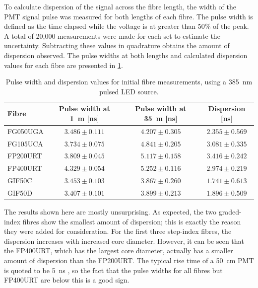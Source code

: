 \documentclass[a4paper,11pt]{article}
\begin{document}
To calculate dispersion of the signal across the fibre length, the width of the PMT signal pulse was measured for both lengths of each fibre. The pulse width is defined as the time elapsed while the voltage is at greater than 50\% of the peak. A total of 20,000 measurements were made for each set to estimate the uncertainty. Subtracting these values in quadrature obtains the amount of dispersion observed. The pulse widths at both lengths and calculated dispersion values for each fibre are presented in \cref{tab:dispinit}.
\begin{table}[h]
\centering
\begin{tabular}{lccc}
\toprule
Fibre	   & Pulse width at 1~m [ns]  & Pulse width at 35~m [ns] &  Dispersion [ns]		\\ \midrule
FG050UGA   &  $3.486\pm0.111$	      &  $4.207\pm0.305$         &  $2.355\pm0.569$     \\
FG105UCA   &  $3.734\pm0.075$	      &  $4.841\pm0.205$ 		 &  $3.081\pm0.335$     \\
FP200URT   &  $3.809\pm0.045$	      &  $5.117\pm0.158$	   	 &  $3.416\pm0.242$     \\
FP400URT   &  $4.329\pm0.054$	      &  $5.252\pm0.116$ 		 &  $2.974\pm0.219$     \\
GIF50C     &  $3.453\pm0.103$    	  &  $3.867\pm0.260$ 	     &  $1.741\pm0.613$     \\
GIF50D     &  $3.407\pm0.101$		  &  $3.899\pm0.213$ 		 &  $1.896\pm0.509$     \\ \bottomrule
\end{tabular}
\caption{Pulse width and dispersion values for initial fibre measurements, using a 385~nm pulsed LED source.}\label{tab:dispinit}
\end{table}
The results shown here are mostly unsurprising. As expected, the two graded-index fibres show the smallest amount of dispersion; this is exactly the reason they were added for consideration. For the first three step-index fibres, the dispersion increases with increased core diameter. However, it can be seen that the FP400URT, which has the largest core diameter, actually has a smaller amount of dispersion than the FP200URT. The typical rise time of a 50~cm PMT is quoted to be 5~ns \cite{bib:hkpmt}, so the fact that the pulse widths for all fibres but FP400URT are below this is a good sign.
\end{document}
